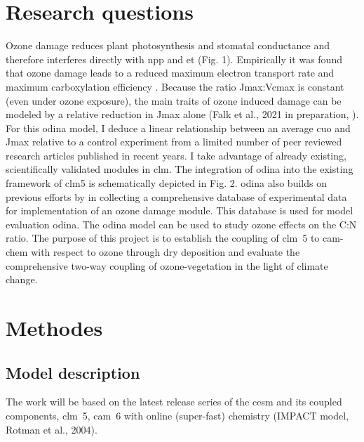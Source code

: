 \documentclass[11pt, a4paper, oneside, article]{memoir}
\newcommand{\pcite}[1]{\parencite{#1}}
\begin{document}
\chapter{Research questions}
Ozone damage reduces plant photosynthesis and stomatal conductance and therefore interferes directly with \gls{npp} and \gls{et} (Fig. 1). Empirically it was found that ozone damage leads to a reduced maximum electron transport rate  and maximum carboxylation efficiency  \pcite{EJA:Emberson2018}. Because the ratio Jmax:Vcmax is constant (even under ozone exposure), the main traits of ozone induced damage can be modeled by a relative reduction in Jmax alone (Falk et al., 2021 in preparation, \cite{BGS:Franz2017}\cite{BGS:Franz2018}). For this \gls{odina} model, I deduce a linear relationship between an average \gls{cuo} and Jmax relative to a control experiment from a limited number of peer reviewed research articles published in recent years. I take advantage of already existing, scientifically validated modules in \gls{clm}. The integration of \gls{odina} into the existing framework of \gls{clm}5 is schematically depicted in Fig. 2. \gls{odina} also builds on previous efforts by \cite{BGS:Lombardozzi2012}\cite{BGS:Lombardozzi2013} in collecting a comprehensive database of experimental data for implementation of an ozone damage module. This database is used for model evaluation \gls{odina}. The \gls{odina} model can be used to study ozone effects on the C:N ratio. The purpose of this project is to establish the coupling of \gls{clm}~5 to \gls{cam}-chem with respect to ozone through dry deposition and evaluate the comprehensive two-way coupling of ozone-vegetation in the light of climate change.

\chapter{Methodes}
\section*{Model description}
The work will be based on the latest release series of the \gls{cesm} and its coupled components, \gls{clm}~5, \gls{cam}~6 with online (super-fast) chemistry (IMPACT model, Rotman et al., 2004).
\end{document}

